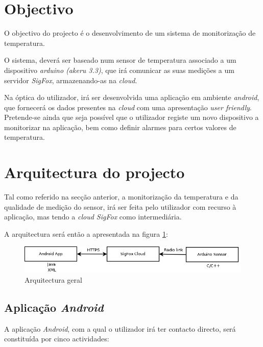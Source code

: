 \documentclass[a4paper]{article}
\begin{document}


\section{Objectivo}

O objectivo do projecto é o desenvolvimento de um sistema de monitorização de temperatura. 

O sistema, deverá ser baseado num sensor de temperatura associado a um dispositivo \textit{arduino (akeru 3.3)}, que irá comunicar as suas medições a um servidor \textit{SigFox}, armazenando-as na \textit{cloud}.

Na óptica do utilizador, irá ser desenvolvida uma aplicação em ambiente \textit{android}, que fornecerá os dados presentes na \textit{cloud} com uma apresentação \textit{user friendly}. Pretende-se ainda que seja possível que o utilizador registe um novo dispositivo a monitorizar na aplicação, bem como definir alarmes para certos valores de temperatura.

\section{Arquitectura do projecto}

Tal como referido na secção anterior, a monitorização da temperatura e da qualidade de medição do sensor, irá ser feita pelo utilizador com recurso à aplicação, mas tendo a \textit{cloud SigFox} como intermediária.

A arquitectura será então a apresentada na figura \ref{fig:general}:
\vspace{5mm}

\begin{figure}[hb]
  \centering
  \includegraphics[scale=0.30]{general.png}
  \caption{Arquitectura geral}
  \label{fig:general}
\end{figure}

\subsection{Aplicação \textit{Android}}

A aplicação \textit{Android}, com a qual o utilizador irá ter contacto directo, será constituída por cinco actividades:
\end{document}
